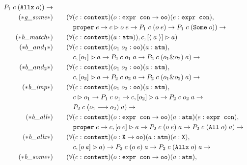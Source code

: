 \begin{figure}
\begin{align*}
P_1 \; c \; (\sltm{Allx} \; o)) \rightarrow \\
(* \rlnmssome{} *) & \qquad (\forall (c : \sltm{context}) (o : \sltm{expr con} \rightarrow \sltm{oo}) (e : \sltm{expr con}), \\
& \qquad\quad \hybridtm{proper} \; e \rightarrow \seqsl[c]{o \; e} \rightarrow P_1 \; c \; (o \; e) \rightarrow
P_1 \; c \; (\sltm{Some} \; o)) \rightarrow \\
(* \rlnmbmatch{} *) & \qquad (\forall (c : \sltm{context}) (a : \sltm{atm})), \bchsl[c]{\atom{a}}{a}) \\
(* \rlnmbanda{} *) & \qquad (\forall (c : \sltm{context}) (o_1 \; o_2 : \sltm{oo}) (a : \sltm{atm}), \\
& \qquad\quad \bchsl[c]{o_1}{a} \rightarrow P_2 \; c \; o_1 \; a \rightarrow P_2 \; c \; (o_1 \& o_2) \; a) \rightarrow \\
(* \rlnmbandb{} *) & \qquad (\forall (c : \sltm{context}) (o_1 \; o_2 : \sltm{oo}) (a : \sltm{atm}), \\
& \qquad\quad \bchsl[c]{o_2}{a} \rightarrow P_2 \; c \; o_2 \; a \rightarrow P_2 \; c \; (o_1 \& o_2) \; a) \rightarrow \\
(* \rlnmbimp{} *) & \qquad (\forall (c : \sltm{context}) (o_1 \; o_2 : \sltm{oo}) (a : \sltm{atm}), \\
& \qquad\quad \seqsl[c]{o_1} \rightarrow P_1 \; c \; o_1 \rightarrow \bchsl[c]{o_2}{a} \rightarrow P_2 \; c \; o_2 \; a \rightarrow  \\
& \qquad\quad P_2 \; c \; (o_1 \longrightarrow o_2) \; a) \rightarrow \\
(* \rlnmball{} *) & \qquad (\forall (c : \sltm{context}) (o : \sltm{expr con} \rightarrow \sltm{oo}) (a : \sltm{atm}) (e : \sltm{expr con}), \\
& \qquad\quad \hybridtm{proper} \; e \rightarrow \bchsl[c]{o \; e}{a} \rightarrow P_2 \; c \; (o \; e) \; a \rightarrow
P_2 \; c \; (\sltm{All} \; o) \; a) \rightarrow \\
(* \rlnmballs{} *) & \qquad (\forall (c : \sltm{context}) (o : \sltm{X} \rightarrow \sltm{oo}) (a : \sltm{atm}) (e : \sltm{X}), \\
& \qquad\quad \bchsl[c]{o \; e}{a}) \rightarrow P_2 \; c \; (o \; e) \; a \rightarrow
P_2 \; c \; (\sltm{Allx} \; o) \; a \rightarrow \\
(* \rlnmbsome{} *) & \qquad (\forall (c : \sltm{context}) (o : \sltm{expr con} \rightarrow \sltm{oo}) (a : \sltm{atm}), \\

\end{align*}
\end{figure}
